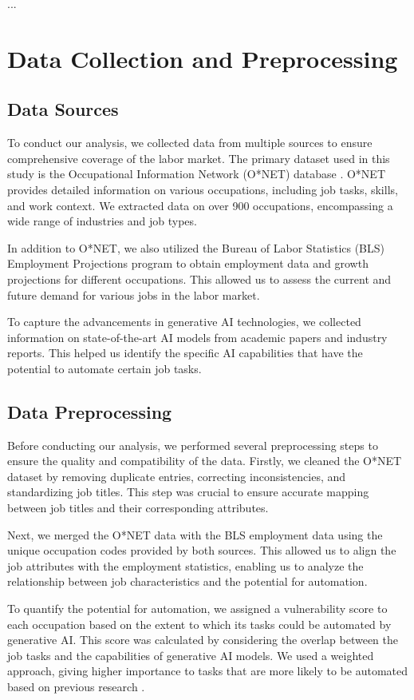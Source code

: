 \documentclass{article}
\begin{document}
...
\section{Data Collection and Preprocessing}

\subsection{Data Sources}
To conduct our analysis, we collected data from multiple sources to ensure comprehensive coverage of the labor market. The primary dataset used in this study is the Occupational Information Network (O*NET) database \cite{onet}. O*NET provides detailed information on various occupations, including job tasks, skills, and work context. We extracted data on over 900 occupations, encompassing a wide range of industries and job types.

In addition to O*NET, we also utilized the Bureau of Labor Statistics (BLS) Employment Projections program \cite{bls} to obtain employment data and growth projections for different occupations. This allowed us to assess the current and future demand for various jobs in the labor market.

To capture the advancements in generative AI technologies, we collected information on state-of-the-art AI models from academic papers and industry reports. This helped us identify the specific AI capabilities that have the potential to automate certain job tasks.

\subsection{Data Preprocessing}
Before conducting our analysis, we performed several preprocessing steps to ensure the quality and compatibility of the data. Firstly, we cleaned the O*NET dataset by removing duplicate entries, correcting inconsistencies, and standardizing job titles. This step was crucial to ensure accurate mapping between job titles and their corresponding attributes.

Next, we merged the O*NET data with the BLS employment data using the unique occupation codes provided by both sources. This allowed us to align the job attributes with the employment statistics, enabling us to analyze the relationship between job characteristics and the potential for automation.

To quantify the potential for automation, we assigned a vulnerability score to each occupation based on the extent to which its tasks could be automated by generative AI. This score was calculated by considering the overlap between the job tasks and the capabilities of generative AI models. We used a weighted approach, giving higher importance to tasks that are more likely to be automated based on previous research \cite{frey2017future}.
\end{document}
